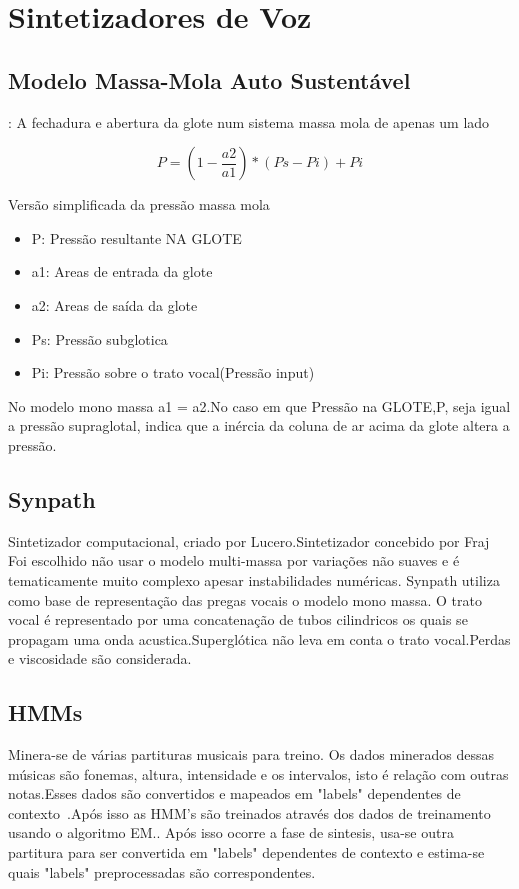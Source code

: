 \section{Sintetizadores de Voz}
	\subsection{Modelo Massa-Mola Auto Sustentável}:
	A fechadura e abertura da glote num sistema massa mola de apenas um lado

	\[
		P = (1 - \frac{a2}{a1})*(Ps- Pi) + Pi
	\]
		
	
	Versão simplificada da pressão massa mola
	\begin{itemize}
		\item P: Pressão resultante NA GLOTE
		\item a1: Areas de entrada da glote
		\item a2: Areas de saída  da glote
		\item Ps: Pressão subglotica
		\item Pi: Pressão sobre o trato vocal(Pressão input)
	\end{itemize}
	
		No modelo mono massa a1 = a2.No caso em que Pressão na GLOTE,P, seja  igual a pressão  supraglotal, indica que a inércia da coluna de ar acima da glote altera a pressão.
	
	
	\subsection{Synpath}
		Sintetizador computacional, criado por Lucero.Sintetizador concebido por Fraj \cite{JeanFrancis}
		Foi escolhido não usar o modelo multi-massa por variações não suaves  e é tematicamente muito complexo apesar instabilidades numéricas.
		Synpath utiliza como base de representação das pregas vocais o modelo mono massa. O trato vocal é representado por uma concatenação de tubos cilindricos os quais se propagam uma onda acustica.Superglótica não leva em conta o trato vocal.Perdas e viscosidade são considerada.
	
	\subsection{HMMs}
		Minera-se de várias partituras musicais para treino. Os dados minerados dessas músicas são fonemas, altura, intensidade e os intervalos, isto é relação com outras notas.Esses dados são convertidos e mapeados em "labels" dependentes de contexto~\cite{DegottexNada}.Após isso as HMM's são treinados através dos dados de treinamento usando o algoritmo EM.\cite{GudnasonNada}. Após isso ocorre a fase de sintesis, usa-se outra partitura para ser convertida em "labels" dependentes de contexto e estima-se quais "labels" preprocessadas são correspondentes.\cite{TakashiNose}
	
